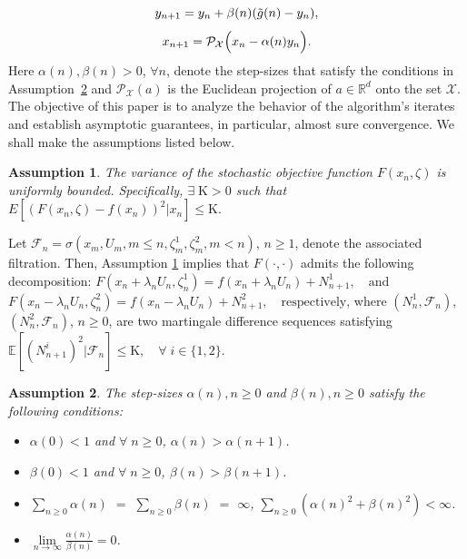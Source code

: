 \documentclass[9pt,journal,twoside,web]{ieeecolor}
\newtheorem{assumption}{Assumption}
\begin{document}
\begin{equation*}
    y_{n+1} = y_n + \beta(n) (\Tilde{g}(n)-y_n),
\end{equation*}
 \begin{equation}
     x_{n+1} = \mathcal{P}_\mathcal{X} \Big{(} x_n - \alpha(n) y_n \Big{)}. 
     \label{mirror descent}
 \end{equation}
 Here $\alpha(n),\beta(n) > 0$, $\forall n$, denote the step-sizes that satisfy the conditions in Assumption~\ref{ass-stepsize} and $\mathcal{P}_\mathcal{X}(a)$ is the Euclidean projection of $a\in\mathbb{R}^d$ onto the set $\mathcal{X}$.
The objective of this paper is to analyze the behavior of the algorithm's iterates and establish  asymptotic guarantees, in particular, almost sure convergence. We shall make the assumptions listed below. 
\begin{assumption}
    The variance of the stochastic objective function $F(x_n,\zeta)$ is uniformly bounded.  Specifically, $\exists \; \mathrm{K} > 0$ such that\\
$
    E[(F(x_n,\zeta)-f(x_n))^2| x_n] \leq \mathrm{K}.
$
\label{assumpvari}
\end{assumption}
Let $\mathcal{F}_n = \sigma(x_m, U_m, m\leq n, \zeta^1_m, \zeta^2_m, m<n)$, $n\geq 1$, denote the associated filtration. Then, 
Assumption \ref{assumpvari} implies that $F(\cdot,\cdot)$ admits the following decomposition: $ F(x_n + \lambda_n U_n, \zeta_n^1) = f(x_n+ \lambda_n U_n) + N_{n+1}^1, \quad \text{and}$
$  F(x_n - \lambda_n U_n, \zeta_n^2) = f(x_n - \lambda_n U_n) + N_{n+1}^2, \quad \text{respectively,}$
 where $(N_{n}^1,\mathcal{F}_n)$, $(N_{n}^2,\mathcal{F}_n)$, $n\geq 0$, are two martingale difference sequences satisfying $ \mathbb{E}[(N_{n+1}^i)^2 | \mathcal{F}_n] \leq \mathrm{K}, \quad \forall \; i \in \{1,2\}.$

\begin{assumption}
   The step-sizes $\alpha(n),n\geq 0$ and $\beta(n), n\geq 0$ satisfy the following conditions: 
    \begin{itemize}
        \item[(a)] $\alpha(0) < 1$ and $\forall \; n \geq 0$, $\alpha(n) > \alpha(n+1)$.
          \item[(b)] $\beta(0) < 1$ and $\forall \; n \geq 0$, $\beta(n) > \beta(n+1)$.
          \item[(c)] $\sum\limits_{n \geq 0} \alpha(n)$ $=$ $\sum\limits_{n \geq 0} \beta (n)$ $=$ $\infty$,  $\sum\limits_{n \geq 0} (\alpha(n)^2 + \beta(n)^2) < \infty$.
          \item[(d)] $\lim\limits_{n \to \infty} \frac{\alpha(n)}{\beta(n)} = 0$.
          
    \end{itemize}
    \label{ass-stepsize}
\end{assumption}
\end{document}
